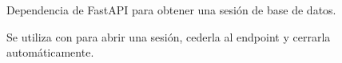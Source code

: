 \documentclass[letterpaper,10pt,spanish]{sphinxmanual}
\begin{document}

\begin{fulllineitems}
\label{\detokenize{endpoints:main.get_db}}
\pysigstartsignatures
\pysiglinewithargsret
{}
{}
{}
\pysigstopsignatures
\sphinxAtStartPar
Dependencia de FastAPI para obtener una sesión de base de datos.

\sphinxAtStartPar
Se utiliza con  para abrir una sesión, cederla al endpoint y cerrarla automáticamente.

\end{fulllineitems}

\end{document}
